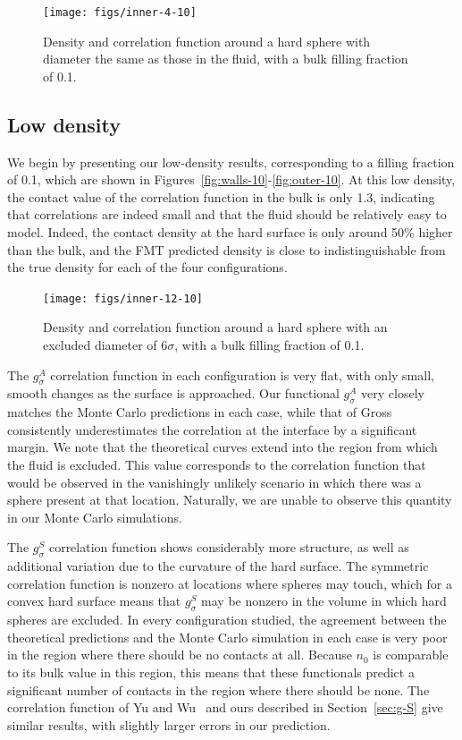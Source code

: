 \documentclass[letterpaper,amsmath,amssymb,10pt,pre]{revtex4-1}
\begin{document}
\begin{figure}
  \texttt{[image: figs/inner-4-10]}
  \caption{Density and correlation function around a hard sphere with
    diameter the same as those in the fluid, with a bulk filling
    fraction of 0.1.}
  \label{fig:inner-4-10}
\end{figure}

\subsection{Low density}

We begin by presenting our low-density results, corresponding to a
filling fraction of 0.1, which are shown in
Figures~\ref{fig:walls-10}-\ref{fig:outer-10}.  At this low density,
the contact value of the correlation function in the bulk is only 1.3,
indicating that correlations are indeed small and that the fluid should be
relatively easy to model.  Indeed, the contact density at the hard
surface is only around 50\% higher than the bulk, and the FMT
predicted density is close to indistinguishable from the true
density for each of the four configurations.

\begin{figure}
  \texttt{[image: figs/inner-12-10]}
  \caption{Density and correlation function around a hard sphere with
    an excluded diameter of $6\sigma$, with a bulk filling fraction of
    0.1.}
  \label{fig:inner-12-10}
\end{figure}

The $g_\sigma^A$ correlation function in each configuration is very
flat, with only small, smooth changes as the surface is approached.
Our functional $g_\sigma^A$ very closely matches the Monte Carlo
predictions in each case, while that of Gross consistently
underestimates the correlation at the interface by a significant margin.  We note that the theoretical curves
extend into the region from which the fluid is excluded.  This value
corresponds to the correlation function that would be observed in the
vanishingly unlikely scenario in which there was a sphere present at
that location.  Naturally, we are unable to observe this quantity in
our Monte Carlo simulations.

The $g_\sigma^S$ correlation function shows considerably more
structure, as well as additional variation due to the curvature of the
hard surface.  The symmetric correlation function is nonzero at
locations where spheres may touch, which for a convex hard surface
means that $g_\sigma^S$ may be nonzero in the volume in which hard
spheres are excluded.  In every configuration studied, the agreement
between the theoretical predictions and the Monte Carlo simulation in
each case is very poor in the region where there should be no contacts
at all.  Because $n_0$ is comparable to its bulk value in this region,
this means that these functionals predict a significant number of
contacts in the region where there should be none.  The correlation
function of Yu and Wu~\cite{yu2002fmt-dft-inhomogeneous-associating}
and ours described in Section~\ref{sec:g-S} give similar results, with
slightly larger errors in our prediction.
\end{document}
